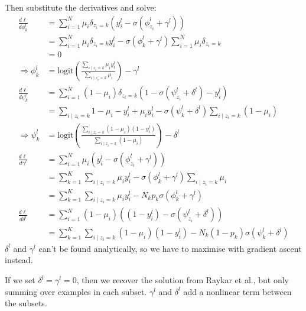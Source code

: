 \documentclass[a4paper]{article}
\begin{document}
Then substitute the derivatives and solve:
\begin{align}
    \frac{d\ell}{d\phi^l_k} &= \sum_{i = 1}^N \mu_i \delta_{z_i = k} \left(y_i^l - \sigma(\phi_{z_i}^l + \gamma^l)\right)\\
         &= \sum_{i = 1}^N \mu_i \delta_{z_i = k} y_i^l - \sigma(\phi_k^l + \gamma^l) \sum_{i = 1}^N \mu_i \delta_{z_i = k}\\
         &= 0\\
    \Rightarrow \phi_k^l &= \mathrm{logit}\left(\frac{\sum_{i \mid z_i = k} \mu_i y_i^l}{\sum_{i \mid z_i = k} \mu_i}\right) - \gamma^l\\
    \frac{d\ell}{d\psi^l_k} &= \sum_{i = 1}^N (1 - \mu_i) \delta_{z_i = k} \left(1 - \sigma(\psi_{z_i}^l + \delta^l) - y_i^l\right)\\
         &= \sum_{i \mid z_i = k} 1 - \mu_i - y_i^l + \mu_i y_i^l - \sigma(\psi_k^l + \delta^l) \sum_{i \mid z_i = k} (1 - \mu_i)\\
    \Rightarrow \psi_k^l &= \mathrm{logit}\left(\frac{\sum_{i \mid z_i = k} (1 - \mu_i) (1 - y_i^l)}{\sum_{i \mid z_i = k} (1 - \mu_i)}\right) - \delta^l\\
    \frac{d\ell}{d\gamma^l} &= \sum_{i = 1}^N \mu_i \left(y_i^l - \sigma(\phi_{z_i}^l + \gamma^l)\right)\\
        &= \sum_{k = 1}^K \sum_{i \mid z_i = k} \mu_i y_i^l - \sigma(\phi_k^l + \gamma^l) \sum_{i \mid z_i = k} \mu_i\\
        &= \sum_{k = 1}^K \sum_{i \mid z_i = k} \mu_i y_i^l - N_k p_k \sigma(\phi_k^l + \gamma^l)\\
    \frac{d\ell}{d\delta^l} &= \sum_{i = 1}^N (1 - \mu_i) \left((1 - y_i^l) - \sigma(\psi_{z_i}^l + \delta^l)\right)\\
        &= \sum_{k = 1}^K \sum_{i \mid z_i = k} (1 - \mu_i) (1 - y_i^l) - N_k (1 - p_k) \sigma(\psi_k^l + \delta^l)
\end{align}
$\delta^l$ and $\gamma^l$ can't be found analytically, so we have to maximise with gradient ascent instead.

If we set $\delta^l = \gamma^l = 0$, then we recover the solution from Raykar et al., but only summing over examples in each subset. $\gamma^l$ and $\delta^l$ add a nonlinear term between the subsets.
\end{document}

